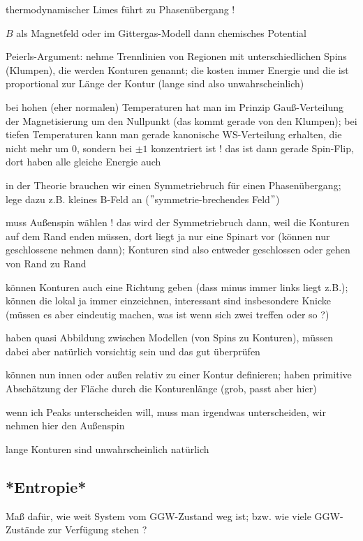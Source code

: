 thermodynamischer Limes führt zu Phasenübergang !



$B$ als Magnetfeld oder im Gittergas-Modell dann chemisches Potential

Peierls-Argument: nehme Trennlinien von Regionen mit unterschiedlichen Spins (Klumpen), die werden Konturen genannt; die kosten immer Energie und die ist proportional zur Länge der Kontur (lange sind also unwahrscheinlich)

bei hohen (eher normalen) Temperaturen hat man im Prinzip Gauß-Verteilung der Magnetisierung um den Nullpunkt (das kommt gerade von den Klumpen); bei tiefen Temperaturen kann man gerade kanonische WS-Verteilung erhalten, die nicht mehr um 0, sondern bei $\pm 1$ konzentriert ist ! das ist dann gerade Spin-Flip, dort haben alle gleiche Energie auch

in der Theorie brauchen wir einen Symmetriebruch für einen Phasenübergang; lege dazu z.B. kleines B-Feld an ($"$symmetrie-brechendes Feld$"$)

muss Außenspin wählen ! das wird der Symmetriebruch dann, weil die Konturen auf dem Rand enden müssen, dort liegt ja nur eine Spinart vor (können nur geschlossene nehmen dann); Konturen sind also entweder geschlossen oder gehen von Rand zu Rand

können Konturen auch eine Richtung geben (dass minus immer links liegt z.B.); können die lokal ja immer einzeichnen, interessant sind insbesondere Knicke (müssen es aber eindeutig machen, was ist wenn sich zwei treffen oder so ?)

haben quasi Abbildung zwischen Modellen (von Spins zu Konturen), müssen dabei aber natürlich vorsichtig sein und das gut überprüfen

können nun innen oder außen relativ zu einer Kontur definieren; haben primitive Abschätzung der Fläche durch die Konturenlänge (grob, passt aber hier)

wenn ich Peaks unterscheiden will, muss man irgendwas unterscheiden, wir nehmen hier den Außenspin

lange Konturen sind unwahrscheinlich natürlich



	\subsection{*Entropie*}
Maß dafür, wie weit System vom GGW-Zustand weg ist; bzw. wie viele GGW-Zustände zur Verfügung stehen ?

